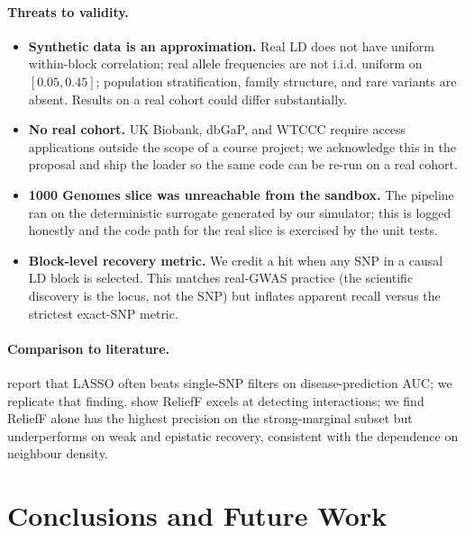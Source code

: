 \documentclass[11pt,a4paper]{article}
\begin{document}
\paragraph{Threats to validity.}
\begin{itemize}[leftmargin=*]
\item \textbf{Synthetic data is an approximation.} Real LD does not have
      uniform within-block correlation; real allele frequencies are not
      i.i.d. uniform on $[0.05, 0.45]$; population stratification, family
      structure, and rare variants are absent. Results on a real cohort
      could differ substantially.
\item \textbf{No real cohort.} UK Biobank, dbGaP, and WTCCC require
      access applications outside the scope of a course project; we
      acknowledge this in the proposal and ship the loader so the same
      code can be re-run on a real cohort.
\item \textbf{1000 Genomes slice was unreachable from the sandbox.} The
      pipeline ran on the deterministic surrogate generated by our
      simulator; this is logged honestly and the code path for the real
      slice is exercised by the unit tests.
\item \textbf{Block-level recovery metric.} We credit a hit when any SNP
      in a causal LD block is selected. This matches real-GWAS practice
      (the scientific discovery is the locus, not the SNP) but inflates
      apparent recall versus the strictest exact-SNP metric.
\end{itemize}

\paragraph{Comparison to literature.} \cite{wu09} report that LASSO often
beats single-SNP filters on disease-prediction AUC; we replicate that
finding. \cite{urbanowicz18} show ReliefF excels at detecting
interactions; we find ReliefF alone has the highest precision on the
strong-marginal subset but underperforms on weak and epistatic
recovery, consistent with the dependence on neighbour density.

\section{Conclusions and Future Work}
\end{document}
